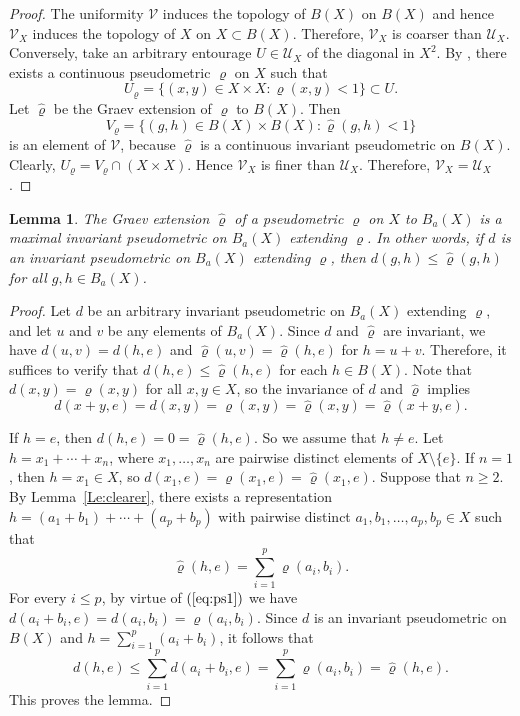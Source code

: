 \documentclass[a4paper,12pt]{amsart}
\def\sub{\subset}
\let\mathcal\mathscr
\newtheorem{lemma}[theorem]{Lemma}
\theoremstyle{definition}
\begin{document}
\begin{proof}
The uniformity $\mathcal{V}$ induces the topology of $B(X)$ on $B(X)$ and hence 
$\mathcal{V}_X$ induces the topology of $X$ on  $X\sub B(X)$. Therefore, 
$\mathcal{V}_X$  is coarser than $\mathcal{U}_X$. Conversely, take an arbitrary 
entourage $U\in\mathcal{U}_X$ of the diagonal in $X^2$. By 
\cite[Theorem~8.1.10]{Eng}, there exists a continuous pseudometric $\varrho$ on 
$X$ such that 
$$ 
U_\varrho=\{(x,y)\in X\times X: \varrho(x,y)<1\} \sub U. 
$$ 
Let $\widehat{\varrho}$ be the Graev extension of $\varrho$ to $B(X)$. Then 
$$ 
V_\varrho = \{(g,h)\in B(X)\times B(X): \widehat{\varrho}(g,h)<1\} 
$$ 
is an element of $\mathcal{V}$, because $\widehat{\varrho}$ is a continuous 
invariant pseudometric on $B(X)$. Clearly, 
$U_\varrho=V_\varrho\cap (X\times X)$. Hence $\mathcal{V}_X$ is finer than 
$\mathcal{U}_X$. Therefore, $\mathcal{V}_X=\mathcal{U}_X$. 
\end{proof}


\begin{lemma}\label{Le:Max}
The Graev extension $\widehat{\varrho}$ of a pseudometric 
$\varrho$ on $X$ to $B_a(X)$ is a maximal invariant pseudometric 
on $B_a(X)$ extending $\varrho$. In other words, if $d$ is an 
invariant pseudometric on $B_a(X)$ extending $\varrho$, then 
$d(g,h)\leq \widehat{\varrho}(g,h)$ for all $g,h\in B_a(X)$.
\end{lemma}

\begin{proof}
Let $d$ be an arbitrary invariant pseudometric on $B_a(X)$ 
extending $\varrho$, and let $u$ and $v$ be any elements of $B_a(X)$. Since
$d$ and $\widehat{\varrho}$ are invariant, we have $d(u,v)=d(h,e)$ and 
$\widehat{\varrho}(u,v)= \widehat{\varrho}(h,e)$ for $h=u+v$. Therefore, 
it suffices to verify that $d(h,e)\leq \widehat{\varrho}(h,e)$ for each $h\in 
B(X)$. Note that $d(x,y)=\varrho(x,y)$ for all $x,y\in X$, so the invariance 
of $d$ and $\widehat{\varrho}$ implies 
\begin{equation} 
\label{eq:ps1}
d(x+y,e)=d(x,y) = 
\varrho(x,y) = \widehat{\varrho}(x,y) = \widehat{\varrho}(x+y,e). 
\end{equation}

If $h=e$, then $d(h,e)=0=\widehat{\varrho}(h,e)$. So we
assume that $h\neq e$. Let $h=x_1+\cdots+x_n$, where 
$x_1,\ldots,x_n$ are
pairwise distinct elements of $X\setminus\{e\}$. If $n=1$, then $h=x_1\in X$, 
so $d(x_1,e)=\varrho(x_1,e)=\widehat{\varrho}(x_1,e)$. Suppose that 
$n\geq 2$. By Lemma~\ref{Le:clearer}, there exists a representation 
$h=(a_1+b_1)+\cdots+(a_p+b_p)$ with pairwise distinct 
$a_1,b_1,\ldots,a_p,b_p\in X$ such that 
$$ 
\widehat{\varrho}(h,e) = \sum_{i=1}^p \varrho(a_i,b_i). 
$$ 
For every $i\leq p$, by virtue of $(\ref{eq:ps1})$ 
we have $d(a_i+b_i,e)=d(a_i,b_i)=\varrho(a_i,b_i)$. Since $d$ is an 
invariant pseudometric on $B(X)$ and $h=\sum_{i=1}^p (a_i+b_i)$, it follows 
that 
$$ 
d(h,e)\leq \sum_{i=1}^p d(a_i+b_i,e) = \sum_{i=1}^p 
\varrho(a_i,b_i) = \widehat{\varrho}(h,e). 
$$ 
This proves the lemma. 
\end{proof}
\end{document}
